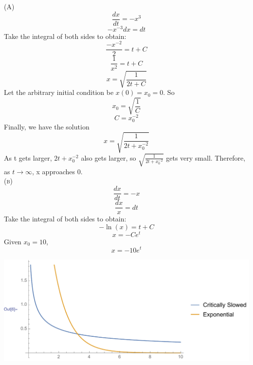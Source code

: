 \documentclass[11pt,answers]{exam}
\begin{document}
\begin{questions}
\begin{solution}
(A)
\begin{equation*}
\frac{dx}{dt} = -x^3
\end{equation*}
\begin{equation*}
-x^{-3} dx = dt
\end{equation*}
Take the integral of both sides to obtain:
\begin{equation*}
\frac{-x^{-2}}{2} = t + C
\end{equation*}
\begin{equation*}
\frac{1}{x^2} = t + C
\end{equation*}
\begin{equation*}
x = \sqrt{\frac{1}{2t + C}}
\end{equation*}
Let the arbitrary initial condition be $x(0) = x_0 = 0$. So 
\begin{equation*}
x_0 = \sqrt{\frac{1}{C}}
\end{equation*}
\begin{equation*}
C = x_0 ^{-2}
\end{equation*}
Finally, we have the solution
\begin{equation*}
x = \sqrt{\frac{1}{2t + x_0 ^{-2}}}
\end{equation*}
As t gets larger, $2t + x_0 ^{-2}$ also gets larger, so $\sqrt{\frac{1}{2t + x_0 ^{-2}}}$ gets very small. Therefore, as $t \to \infty$, x approaches $0$. \\ 
\newline\newline\textsc{(b)} 
\begin{equation*}
\frac{dx}{dt} = -x
\end{equation*}
\begin{equation*}
\frac{dx}{x} = dt
\end{equation*}
Take the integral of both sides to obtain:
\begin{equation*}
-\ln(x) = t+ C
\end{equation*}
\begin{equation*}
x = -Ce^t
\end{equation*}
Given $x_0 = 10$,
\begin{equation*}
x = -10e^t
\end{equation*}

\includegraphics[width = \textwidth]{plot}
\end{solution}


\end{questions}
\end{document}
